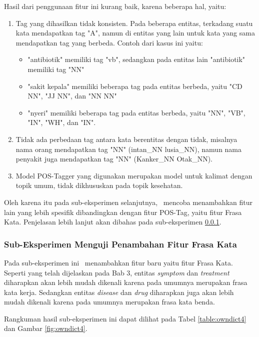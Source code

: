 	Hasil dari penggunaan fitur ini kurang baik, karena beberapa hal, yaitu:
	\begin{enumerate}
		\item Tag yang dihasilkan tidak konsisten. Pada beberapa entitas, terkadang suatu kata mendapatkan tag "A", namun di entitas yang lain untuk kata yang sama mendapatkan tag yang berbeda. Contoh dari kasus ini yaitu:
		\begin{itemize}
			\item "antibiotik" memiliki tag "vb", sedangkan pada entitas lain "antibiotik" memiliki tag "NN"
			\item "sakit kepala" memiliki beberapa tag pada entitas berbeda, yaitu "CD NN", "JJ NN", dan "NN NN"
			\item "nyeri" memiliki beberapa tag pada entitas berbeda, yaitu "NN", "VB", "IN", "WH", dan "IN".
		\end{itemize}
		\item Tidak ada perbedaan tag antara kata berentitas dengan tidak, misalnya nama orang mendapatkan tag "NN" (intan\_NN lusia\_NN), namun nama penyakit juga mendapatkan tag "NN" (Kanker\_NN Otak\_NN).
		\item Model POS-Tagger yang digunakan merupakan model untuk kalimat dengan topik umum, tidak dikhususkan pada topik kesehatan.
	\end{enumerate}
	
	Oleh karena itu pada sub-eksperimen selanjutnya, \saya~mencoba menambahkan fitur lain yang lebih spesifik dibandingkan dengan fitur POS-Tag, yaitu fitur Frasa Kata. Penjelasan lebih lanjut akan dibahas pada sub-eksperimen \ref{eks:subeksfrasa}.
	
	\subsubsection{Sub-Eksperimen Menguji Penambahan Fitur Frasa Kata}\label{eks:subeksfrasa}
	Pada sub-eksperimen ini \saya~menambahkan fitur baru yaitu fitur Frasa Kata. Seperti yang telah dijelaskan pada Bab 3, entitas \textit{symptom} dan \textit{treatment} diharapkan akan lebih mudah dikenali karena pada umumnya merupakan frasa kata kerja. Sedangkan entitas \textit{disease} dan \textit{drug} diharapkan juga akan lebih mudah dikenali karena pada umumnya merupakan frasa kata benda.
	
	Rangkuman hasil sub-eksperimen ini dapat dilihat pada Tabel \ref{table:owndict4} dan Gambar \ref{fig:owndict4}.
	
